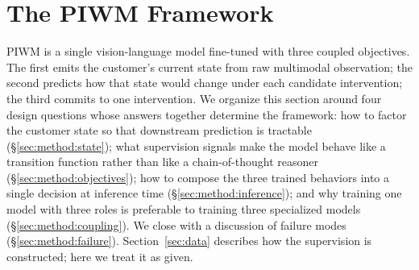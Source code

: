 \documentclass{article}
\begin{document}

\section{The PIWM Framework}
\label{sec:method}

PIWM is a single vision-language model fine-tuned with three coupled objectives. The first emits the customer's current state from raw multimodal observation; the second predicts how that state would change under each candidate intervention; the third commits to one intervention. We organize this section around four design questions whose answers together determine the framework: how to factor the customer state so that downstream prediction is tractable (§\ref{sec:method:state}); what supervision signals make the model behave like a transition function rather than like a chain-of-thought reasoner (§\ref{sec:method:objectives}); how to compose the three trained behaviors into a single decision at inference time (§\ref{sec:method:inference}); and why training one model with three roles is preferable to training three specialized models (§\ref{sec:method:coupling}). We close with a discussion of failure modes (§\ref{sec:method:failure}). Section~\ref{sec:data} describes how the supervision is constructed; here we treat it as given.
\end{document}
